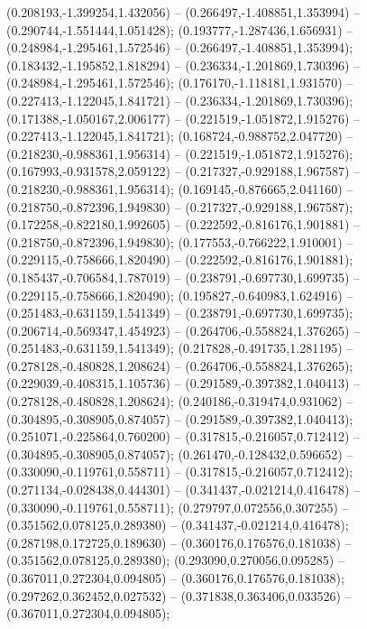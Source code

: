  (0.208193,-1.399254,1.432056) -- (0.266497,-1.408851,1.353994) -- (0.290744,-1.551444,1.051428);
 (0.193777,-1.287436,1.656931) -- (0.248984,-1.295461,1.572546) -- (0.266497,-1.408851,1.353994);
 (0.183432,-1.195852,1.818294) -- (0.236334,-1.201869,1.730396) -- (0.248984,-1.295461,1.572546);
 (0.176170,-1.118181,1.931570) -- (0.227413,-1.122045,1.841721) -- (0.236334,-1.201869,1.730396);
 (0.171388,-1.050167,2.006177) -- (0.221519,-1.051872,1.915276) -- (0.227413,-1.122045,1.841721);
 (0.168724,-0.988752,2.047720) -- (0.218230,-0.988361,1.956314) -- (0.221519,-1.051872,1.915276);
 (0.167993,-0.931578,2.059122) -- (0.217327,-0.929188,1.967587) -- (0.218230,-0.988361,1.956314);
 (0.169145,-0.876665,2.041160) -- (0.218750,-0.872396,1.949830) -- (0.217327,-0.929188,1.967587);
 (0.172258,-0.822180,1.992605) -- (0.222592,-0.816176,1.901881) -- (0.218750,-0.872396,1.949830);
 (0.177553,-0.766222,1.910001) -- (0.229115,-0.758666,1.820490) -- (0.222592,-0.816176,1.901881);
 (0.185437,-0.706584,1.787019) -- (0.238791,-0.697730,1.699735) -- (0.229115,-0.758666,1.820490);
 (0.195827,-0.640983,1.624916) -- (0.251483,-0.631159,1.541349) -- (0.238791,-0.697730,1.699735);
 (0.206714,-0.569347,1.454923) -- (0.264706,-0.558824,1.376265) -- (0.251483,-0.631159,1.541349);
 (0.217828,-0.491735,1.281195) -- (0.278128,-0.480828,1.208624) -- (0.264706,-0.558824,1.376265);
 (0.229039,-0.408315,1.105736) -- (0.291589,-0.397382,1.040413) -- (0.278128,-0.480828,1.208624);
 (0.240186,-0.319474,0.931062) -- (0.304895,-0.308905,0.874057) -- (0.291589,-0.397382,1.040413);
 (0.251071,-0.225864,0.760200) -- (0.317815,-0.216057,0.712412) -- (0.304895,-0.308905,0.874057);
 (0.261470,-0.128432,0.596652) -- (0.330090,-0.119761,0.558711) -- (0.317815,-0.216057,0.712412);
 (0.271134,-0.028438,0.444301) -- (0.341437,-0.021214,0.416478) -- (0.330090,-0.119761,0.558711);
 (0.279797,0.072556,0.307255) -- (0.351562,0.078125,0.289380) -- (0.341437,-0.021214,0.416478);
 (0.287198,0.172725,0.189630) -- (0.360176,0.176576,0.181038) -- (0.351562,0.078125,0.289380);
 (0.293090,0.270056,0.095285) -- (0.367011,0.272304,0.094805) -- (0.360176,0.176576,0.181038);
 (0.297262,0.362452,0.027532) -- (0.371838,0.363406,0.033526) -- (0.367011,0.272304,0.094805);
